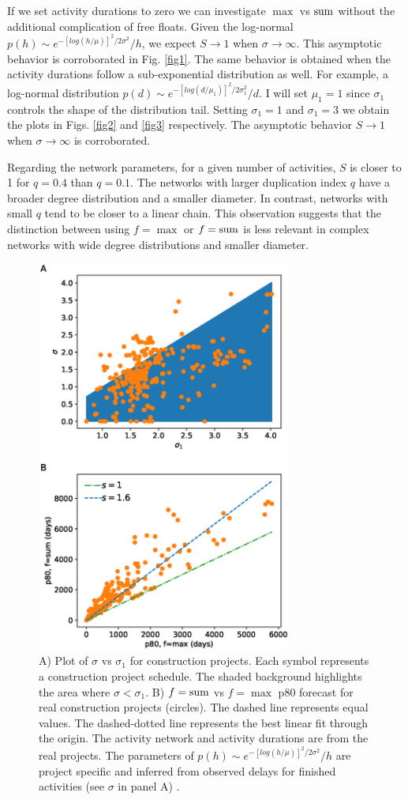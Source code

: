 \documentclass[reprint,aps,prl,amsmath,amssymb,superscriptaddress,showpacs]{revtex4-1}
\begin{document}
If we set activity durations to zero we can investigate $\max$ vs ${\rm sum}$ without the additional complication of free floats. Given the log-normal $p(h)\sim e^{-[log(h/\mu)]^2/2\sigma^2}/h$, we expect $S\rightarrow1$ when $\sigma\rightarrow\infty$. This asymptotic behavior is corroborated in Fig. \ref{fig1}.
The same behavior is obtained when the activity durations follow a sub-exponential distribution as well. For example, a log-normal distribution $p(d)\sim e^{-[log(d/\mu_1)]^2/2\sigma_1^2}/d$. I will set $\mu_1=1$ since $\sigma_1$ controls the shape of the distribution tail. Setting $\sigma_1=1$ and $\sigma_1=3$ we obtain the plots in Figs. \ref{fig2} and \ref{fig3} respectively. The asymptotic behavior $S\rightarrow1$ when $\sigma\rightarrow\infty$ is corroborated.

Regarding the network parameters, for a given number of activities, $S$ is closer to 1 for $q=0.4$ than $q=0.1$. The networks with larger duplication index $q$ have a broader degree distribution and a smaller diameter. In contrast, networks with small $q$ tend to be closer to a linear chain. This observation suggests that the distinction between using $f={\max}$ or $f={\rm sum}$ is less relevant in complex networks with wide degree distributions and smaller diameter.  

\begin{figure}[t]
\includegraphics[width=3.3in]{fig.sigma_vs_sigma1.eps}
\caption{A) Plot of $\sigma$ vs $\sigma_1$ for construction projects. Each symbol represents a construction project schedule. The shaded background highlights the area where $\sigma<\sigma_1$. B) $f={\rm sum}$ vs $f=\max$ p80 forecast for real construction projects (circles). The dashed line represents equal values. The dashed-dotted line represents the best linear fit through the origin. The activity network and activity durations are from the real projects. The parameters of $p(h)\sim e^{-[log(h/\mu)]^2/2\sigma^2}/h$ are project specific and inferred from observed delays for finished activities (see $\sigma$ in panel A) .}
\label{fig4}
\end{figure}
\end{document}
